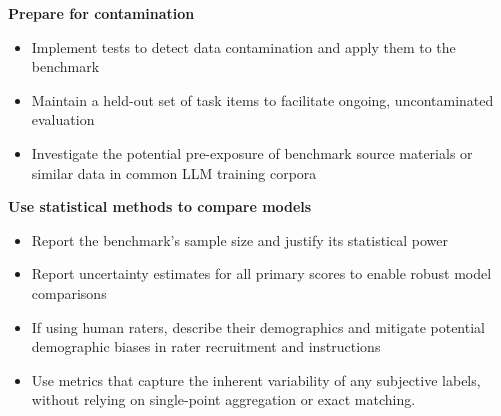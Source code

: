 \textbf{Prepare for contamination}
\begin{itemize}[leftmargin=25pt, label=\scriptsize$\square$]
    \item Implement tests to detect data contamination and apply them to the benchmark
    \item Maintain a held-out set of task items to facilitate ongoing, uncontaminated evaluation
    \item Investigate the potential pre-exposure of benchmark source materials or similar data in common LLM training corpora
\end{itemize}

\textbf{Use statistical methods to compare models}
\begin{itemize}[leftmargin=25pt, label=\scriptsize$\square$]
     \item Report the benchmark's sample size and justify its statistical power
     \item Report uncertainty estimates for all primary scores to enable robust model comparisons
     \item If using human raters, describe their demographics and mitigate potential demographic biases in rater recruitment and instructions
    \item Use metrics that capture the inherent variability of any subjective labels, without relying on single-point aggregation or exact matching.
\end{itemize}

